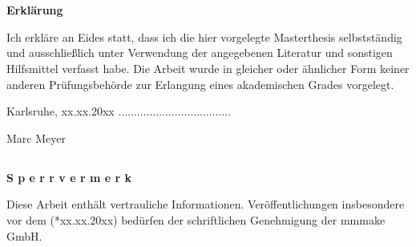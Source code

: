 \thispagestyle{empty}
\setcounter{page}{3}       %

\chapter*{}
\centerline{\Large \textsf{\textbf{Erklärung}}} \label{Erklaerung}%
\vspace*{2ex}
%
Ich erkläre an Eides statt, dass ich die hier vorgelegte Masterthesis
selbstständig und ausschließlich unter Verwendung der angegebenen
Literatur und sonstigen Hilfsmittel verfasst habe. Die Arbeit wurde in
gleicher oder ähnlicher Form keiner anderen Prüfungsbehörde zur
Erlangung eines akademischen Grades vorgelegt.\\

\vspace{1.5cm}

Karlsruhe, xx.xx.20xx \hfill
$\ldots \ldots \ldots \ldots \ldots \ldots \ldots \ldots \ldots \ldots \ldots \ldots$\

\hspace*{10cm} Marc Meyer


\vspace{4cm}


\section*{}
\centerline{\Large \textsf{\textbf{S p e r r v e r m e r k}}} %

Diese Arbeit enthält vertrauliche Informationen. 
Veröffentlichungen insbesondere vor dem (*xx.xx.20xx) 
bedürfen der schriftlichen Genehmigung der mmmake GmbH.


\raggedbottom
\cleardoublepage
